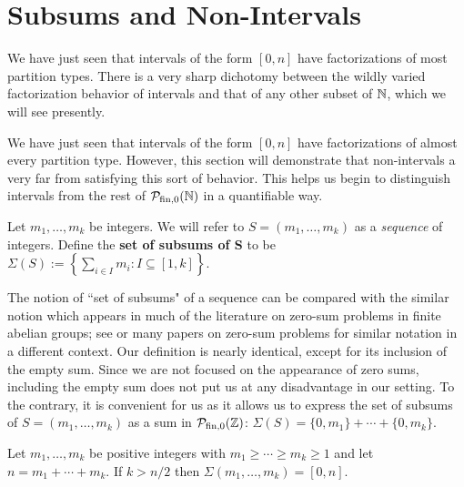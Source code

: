 \section{Subsums and Non-Intervals} \label{sec:subsums}
We have just seen that intervals of the form $[ 0,n ]$ have factorizations of most partition types.
There is a very sharp dichotomy between the wildly varied factorization behavior of intervals and that of any other subset of $\mathbb{N}$, which we will see presently.  

We have just seen that intervals of the form $[0,n]$ have factorizations of almost every partition type.
However, this section will demonstrate that non-intervals a very far from satisfying this sort of behavior.
This helps us begin to distinguish intervals from the rest of ${\mathcal{P}_{\textrm{fin},0}(\mathbb{N})}$ in a quantifiable way.  

\begin{defn}
Let $m_1,\dots, m_k$ be integers.
We will refer to $S = (m_1,\dots, m_k)$ as a \textit{sequence} of integers.
Define the \textbf{set of subsums of S} to be $\Sigma(S) := \left\{ \sum_{i\in I} m_i : I\subseteq [ 1,k ] \right\}$.
\end{defn}

\begin{rk}
The notion of ``set of subsums" of a sequence can be compared with the similar notion which appears in much of the literature on zero-sum problems in finite abelian groups; see \cite[Definition 5.1.1]{geroldinger-hk06} or many papers on zero-sum problems for similar notation in a different context. 
Our definition is nearly identical, except for its inclusion of the empty sum.
Since we are not focused on the appearance of zero sums, including the empty sum does not put us at any disadvantage in our setting.
To the contrary, it is convenient for us as it allows us to express the set of subsums of $S = (m_1,\dots, m_k)$ as a sum in $\mathcal{P}_{\textrm{fin}, 0}(\mathbb{Z})$: $\Sigma(S)  = \{0,m_1\} + \cdots +\{0,m_k\}$.
\end{rk}

\begin{lemma} \label{lem:long-partitions}
Let $m_1,\dots, m_k$ be positive integers with $m_1\ge \cdots \ge m_k \ge 1$ and let $n = m_1 + \cdots + m_k$.
If $k> n/2$ then $\Sigma(m_1,\dots, m_k) = [ 0,n ]$.
\end{lemma}

